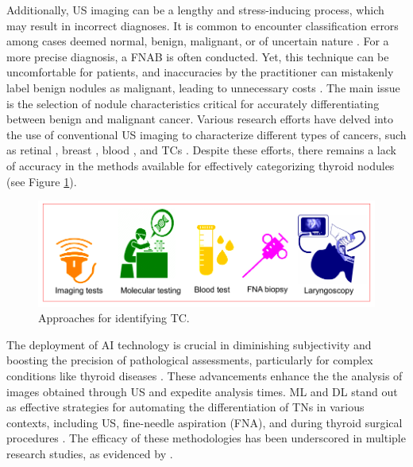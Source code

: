 \documentclass[a4paper,fleqn]{cas-sc}
\begin{document}
Additionally, \ac{US} imaging can be a lengthy and stress-inducing process, which may result in incorrect diagnoses. It is common to encounter classification errors among cases deemed normal, benign, malignant, or of uncertain nature \cite{schlumberger2015lenvatinib, wettasinghe2019diagnostic, nayak2020impact, singh2016diagnostic, kumar2020automated, ma2017ultrasound}. For a more precise diagnosis, a \ac{FNAB} is often conducted. Yet, this technique can be uncomfortable for patients, and inaccuracies by the practitioner can mistakenly label benign nodules as malignant, leading to unnecessary costs \cite{song2018fine, hahn2020comparison}. The main issue is the selection of nodule characteristics critical for accurately differentiating between benign and malignant cancer. Various research efforts have delved into the use of conventional \ac{US} imaging to characterize different types of cancers, such as retinal \cite{ullah2019ensemble, saba2018fundus}, breast \cite{mughal2018removal, morais2023classification, diogo2023weakly, wang2023generalizable, mughal2018novel}, blood \cite{abbas2019automated, abbas2019plasmodium}, and \ac{TC}s \cite{wang2020comparison, qin2019diagnosis}. Despite these efforts, there remains a lack of accuracy in the methods available for effectively categorizing thyroid nodules (see Figure \ref{fig1}).

\begin{figure}[t!]
\centering
\includegraphics[width=0.8\columnwidth]{fig1.pdf}
\caption{Approaches for identifying \ac{TC}.}
\label{fig1}
\end{figure}

The deployment of \ac{AI} technology is crucial in diminishing subjectivity and boosting the precision of pathological assessments, particularly for complex conditions like thyroid diseases \cite{wu2016classifier, zhang2019machine}. These advancements enhance the the analysis of images obtained through \ac{US} and expedite analysis times. \ac{ML} and \ac{DL} stand out as effective strategies for automating the differentiation of TNs in various contexts, including \ac{US}, fine-needle aspiration (FNA), and during thyroid surgical procedures \cite{sollini2018texture, yang2019creating}. The efficacy of these methodologies has been underscored in multiple research studies, as evidenced by \cite{abbad2021effective, taylor2019high, chandio2020decision, zhang2019machine, lee2021deep, buda2019management}.
\end{document}
